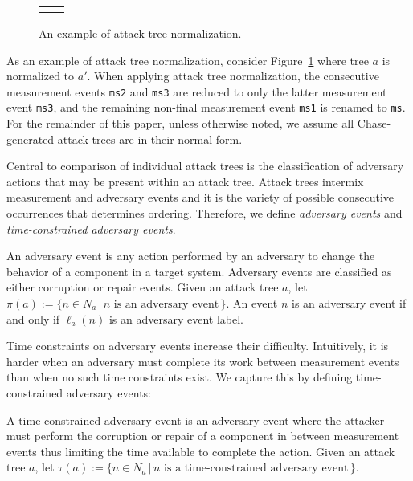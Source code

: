 \documentclass[runningheads]{llncs}
\theoremstyle{definition}
\begin{document}
\begin{figure}[htbp]
  \centering 
  \begin{tabular}{c c}
       &  
  \end{tabular}
  \captionsetup{justification=centering,margin=1cm}
  \caption[Example of attack tree normalization]{An example of attack tree normalization.}
  \label{fig:reduce-ex}
\end{figure}

\noindent As an example of attack tree normalization, consider
Figure~\ref{fig:reduce-ex} where tree $a$ is normalized to $a'$. When
applying attack tree normalization, the consecutive measurement events
\texttt{ms2} and \texttt{ms3} are reduced to only the latter
measurement event \texttt{ms3}, and the remaining non-final
measurement event \texttt{ms1} is renamed to \texttt{ms}. For the
remainder of this paper, unless otherwise noted, we assume all
Chase-generated attack trees are in their normal form.

Central to comparison of individual attack trees is the classification
of adversary actions that may be present within an attack tree. Attack
trees intermix measurement and adversary events and it is the variety
of possible consecutive occurrences that determines
ordering. Therefore, we define \emph{adversary events} and
\emph{time-constrained adversary events}.

\begin{definition}
  An adversary event is any action performed by an adversary to
  change the behavior of a component in a target system. Adversary
  events are classified as either corruption or repair events. Given
  an attack tree $a$, let $\pi(a) := \{n \in N_a \,|\, n \text{ is
    an adversary event}\,\}$. An event $n$ is an adversary event if
  and only if $\ell_a(n)$ is an adversary event label. 
\end{definition}

Time constraints on adversary events increase their difficulty.
Intuitively, it is harder when an adversary must complete its work
between measurement events than when no such time constraints
exist. We capture this by defining time-constrained adversary events:

\begin{definition}
  A time-constrained adversary event is an adversary event where the
  attacker must perform the corruption or repair of a component in
  between measurement events thus limiting the time available to
  complete the action. Given an attack tree $a$, let $\tau(a) := \{n
  \in N_a \,|\, n \text{ is a time-constrained adversary
    event}\,\}$. 
\end{definition}
\end{document}
